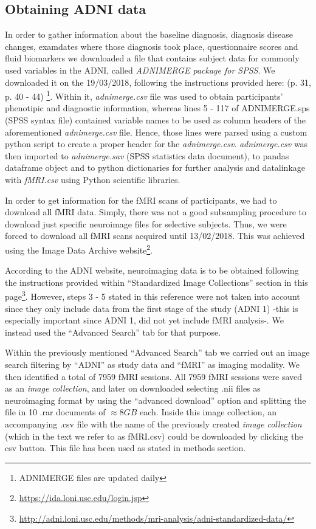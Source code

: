 	\subsection{Obtaining ADNI data} \label{subsec_appendix_obteniribaixarInfoADNI}

	In order to gather information about the baseline diagnosis, diagnosis disease changes, examdates where those diagnosis took place, questionnaire scores and fluid biomarkers we downloaded a file that contains subject data for commonly used variables in the ADNI, called \textit{ADNIMERGE package for SPSS}. We downloaded it on the 19/03/2018, following the instructions provided here: \cite{adni_data_training_part2} (p. 31, p. 40 - 44) \footnote{ADNIMERGE files are updated daily}. Within it, \textit{adnimerge.csv} file was used to obtain participants' phenotipic and diagnostic information, whereas lines 5 - 117 of ADNIMERGE.sps (SPSS syntax file) contained variable names to be used as column headers of the aforementioned \textit{adnimerge.csv} file. Hence, those lines were parsed using a custom python script to create a proper header for the \textit{adnimerge.csv}. \textit{adnimerge.csv} was then imported to \textit{adnimerge.sav} (SPSS statistics data document), to pandas dataframe object and to python dictionaries for further analysis and datalinkage with \textit{fMRI.csv} using Python scientific libraries.
	
	In order to get information for the fMRI scans of participants, we had to download all fMRI data. Simply, there was not a good subsampling procedure to download just specific neuroimage files for selective subjects. Thus, we were forced to download all fMRI scans acquired until 13/02/2018. This was achieved using the Image Data Archive website\footnote{\href{https://ida.loni.usc.edu/login.jsp}{https://ida.loni.usc.edu/login.jsp}}.
	
	According to the ADNI website, neuroimaging data is to be obtained following the instructions provided within ``Standardized Image Collections'' section in this page\footnote{\href{http://adni.loni.usc.edu/methods/mri-analysis/adni-standardized-data/}{http://adni.loni.usc.edu/methods/mri-analysis/adni-standardized-data/}}. However, steps 3 - 5 stated in this reference were not taken into account since they only include data from the first stage of the study (ADNI 1) -this is especially important since ADNI 1, did not yet include fMRI analysis-. We instead used the ``Advanced Search'' tab for that purpose.
	
	Within the previously mentioned ``Advanced Search'' tab we carried out an image search filtering by ``ADNI'' as study data and ``fMRI'' as imaging modality. We then identified a total of 7959 fMRI sessions. All 7959 fMRI sessions were saved as an  \textit{image collection}, and later on downloaded selecting .nii files as neuroimaging format by using the ``advanced download'' option and splitting the file in 10 .rar documents of $ \approx 8 GB$ each. Inside this image collection, an accompanying .csv file with the name of the previously created \textit{image collection} (which in the text we refer to as fMRI.csv) could be downloaded by clicking the csv button. This file has been used as stated in methods section.




